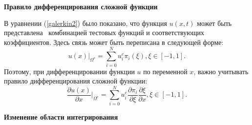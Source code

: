 \textbf{Правило дифференцирования сложной функции}

%
В уравнении (\ref{galerkin2}) было показано, что функция $u(x, t)$ может быть представлена \
комбинацией тестовых функций и соответствующих коэффициентов. 
%
Здесь связь может быть переписана в следующей форме:
%
\begin{equation*}
    u(x)|_{\Omega^e} = \sum^N_{i=0} u^e_i \pi_i(\xi), \xi \in [-1,1].
\end{equation*}
%
Поэтому, при дифференцировании функции $u$ по переменной $x$, 
важно учитывать правило дифференцирования сложной функции:
%
\begin{equation*}
    \frac{\partial u(x)}{\partial x}|_{\Omega^e} = \sum^N_{i=0} 
    u^e_i \frac{\partial \pi_i}{\partial \xi} \frac{\partial \xi}{\partial x}, \xi \in [-1,1].
\end{equation*}
%

\textbf{Изменение области интегрирования}

